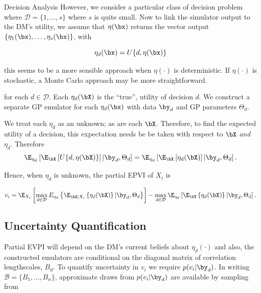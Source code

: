 \begin{chapter}{Decision Analysis \label{Ch:decision}}
However, we consider a particular class of decision problem where $\mathcal{D} = \{1, \ldots, s\}$ where $s$ is quite small. Now to link the simulator output to the DM's utility, we assume that $\eta(\bx)$ returns the vector output $\{\eta_1(\bx), \ldots, \eta_s(\bx) \}$, with

\begin{equation}
	\eta_d(\bx) = U\{ d , \eta(\bx) \}
\end{equation}

this seems to be a more sensible approach when $\eta(\cdot)$ is deterministic. If $\eta(\cdot)$ is stochastic, a Monte Carlo approach may be more straightforward.

for each $d \in \mathcal{D}$. Each $\eta_d(\bX)$ is the ``true'', utility of decision $d$. We construct a separate GP emulator for each $\eta_d(\bx)$ with data $\by_d$ and GP parameters $\Theta_d$.

We treat each $\eta_d$ as an unknown; as are each $\bX$. Therefore, to find the expected utility of a decision, this expectation needs be be taken with respect to $\bX$ \textit{and} $\eta_d$. Therefore
\begin{equation}
\E_{\eta_d} \left[  \E_{\bX}\left[ U\{ d, \eta(\bX) \} \right] | \by_d, \Theta_d \right]
=
\E_{\eta_d} \left[  \E_{\bX}\left[ \eta_d(\bX) \right] | \by_d, \Theta_d \right].
\end{equation}

Hence, when $\eta_d$ is unknown, the partial EPVI of $X_i$ is

\begin{equation}
v_i = \E_{X_i} \left[ \max_{d \in \mathcal{D} } E_{\eta_d} \left\{ \E_{\bX|X_i} \left\{ \eta_d(\bX) \right\}  | \by_d, \Theta_d \right\} \right] - \max_{d \in \mathcal{D}} \E_{\eta_d} \left[ \E_{\bX} \left\{ \eta_d (\bX) \right\} | \by_d, \Theta_d \right].
\end{equation}

\subsection{Uncertainty Quantification}

Partial EVPI will depend on the DM's current beliefs about $\eta_d(\cdot)$ and also, the constructed emulators are conditional on the diagonal matrix of correlation lengthscales, $B_d$. To quantify uncertainty in $v_i$ we require $p(v_i | \by_d)$. In writing $\mathcal{B} = \{B_1,\ldots,B_n\}$, approximate draws from $p(v_i | \by_d)$ are available by sampling from


\end{chapter}
